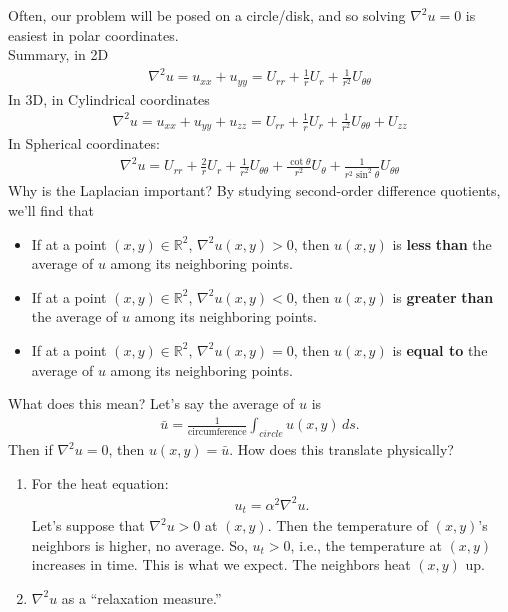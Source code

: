 \documentclass{book}
\theoremstyle{definition}
\newcommand{\R}{\mathbb{R}}
\newcommand{\f}[2]{\frac{#1}{#2}}
\begin{document}
Often, our problem will be posed on a circle/disk, and so solving $\nabla^2 u = 0$ is easiest in polar coordinates. \\

Summary, in 2D
\begin{align*}
\boxed{\nabla^2 u = u_{xx}  + u_{yy} = U_{rr} + \f{1}{r}U_r + \f{1}{r^2}U_{\theta\theta}}
\end{align*}
In 3D, in Cylindrical coordinates
\begin{align*}
\boxed{\nabla^2 u = u_{xx}  + u_{yy} + u_{zz} = U_{rr} + \f{1}{r}U_r + \f{1}{r^2} U_{\theta\theta} + U_{zz} }
\end{align*}
In Spherical coordinates:
\begin{align*}
\boxed{\nabla^2 u  = U_{rr} + \f{2}{r}U_r  +\f{1}{r^2}U_{\theta\theta} + \f{\cot\theta}{r^2}U_\theta + \f{1}{r^2\sin^2\theta}U_{\theta\theta}  }
\end{align*}
Why is the Laplacian important? By studying second-order difference quotients, we'll find that
\begin{itemize}
	\item If at a point $(x,y)\in\R^2$, $\nabla^2 u(x,y) > 0$, then $u(x,y)$ is \textbf{less} \textbf{than} the average of $u$ among its neighboring points.
	\item If at a point $(x,y)\in\R^2$, $\nabla^2 u(x,y) < 0$, then $u(x,y)$ is \textbf{greater} \textbf{than} the average of $u$ among its neighboring points.
	\item If at a point $(x,y)\in\R^2$, $\nabla^2 u(x,y) = 0$, then $u(x,y)$ is \textbf{equal to} the average of $u$ among its neighboring points.
\end{itemize}

What does this mean? Let's say the average of $u$ is 
\begin{align*}
\bar{u} = \f{1}{\text{circumference}}\int_{circle} u(x,y)\,ds.
\end{align*}
Then if $\nabla^2 u = 0$, then $u(x,y) = \bar{u}$. How does this translate physically? 
\begin{enumerate}
	\item For the heat equation: 
	\begin{align*}
	u_t = \alpha^2 \nabla^2 u.
	\end{align*}
	Let's suppose that $\nabla^2 u > 0$ at $(x,y)$. Then the temperature of $(x,y)$'s neighbors is higher, no average. So, $u_t > 0$, i.e., the temperature at $(x,y)$ increases in time. This is what we expect. The neighbors heat $(x,y)$ up. \\
	\item $\nabla^2 u$ as a ``relaxation measure.''
\end{enumerate}
\end{document}
